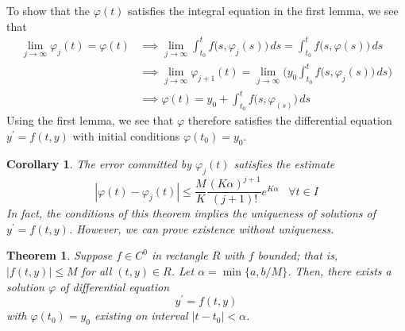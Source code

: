 \documentclass{article}
\newtheorem{theorem}{Theorem}[section]
\newtheorem{corollary}{Corollary}[theorem]
\theoremstyle{remark}
\theoremstyle{definition}
\begin{document}
    To show that the $\varphi(t)$ satisfies the integral equation in the first lemma, we see that
    \begin{align*}
        \lim_{j \rightarrow \infty} \varphi_j (t) = \varphi(t) & \implies \lim_{j \rightarrow \infty} \int_{t_0}^t f\big( s, \varphi_j (s)\big) \, ds = \int_{t_0}^t f\big(s, \varphi(s)\big) \,ds \\
        & \implies \lim_{j \rightarrow \infty} \varphi_{j+1} (t) = \lim_{j \rightarrow \infty} \bigg( y_0 \int_{t_0}^t f \big(s, \varphi_j (s)\big) \,ds\bigg) \\
        & \implies \varphi (t) = y_0 + \int_{t_0}^t f\big(s, \varphi_ (s) \big) \, ds 
    \end{align*}
    Using the first lemma, we see that $\varphi$ therefore satisfies the differential equation $y^\prime = f(t, y)$ with initial conditions $\varphi(t_0) = y_0$. 

    \begin{corollary}
    The error committed by $\varphi_j (t)$ satisfies the estimate 
    \[|\varphi (t) - \varphi_j (t)| \leq \frac{M}{K} \frac{(K \alpha)^{j+1}}{(j+1)!} e^{K \alpha} \;\;\; \forall t \in I\]
    In fact, the conditions of this theorem implies the uniqueness of solutions of $y^\prime = f(t, y)$. However, we can prove existence without uniqueness. 
    \end{corollary}

    \begin{theorem}
    Suppose $f \in C^0$ in rectangle $R$ with $f$ bounded; that is, $|f(t, y)| \leq M$ for all $(t, y) \in R$. Let $\alpha = \min\{a, b /M\}$. Then, there exists a solution $\varphi$ of differential equation
    \[y^\prime = f(t, y)\]
    with $\varphi(t_0) = y_0$ existing on interval $|t - t_0| < \alpha$. 
    \end{theorem}
\end{document}
